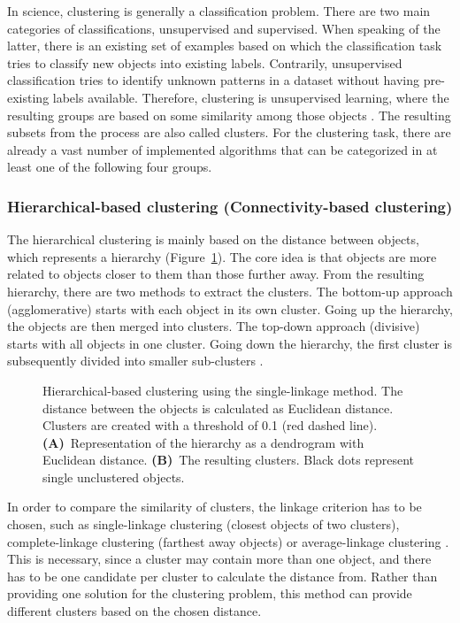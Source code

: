 \documentclass[12pt,a4paper,english]{article}
\begin{document}
	In science, clustering is generally a classification problem.
	There are two main categories of classifications, unsupervised and supervised. When speaking of the latter, there is an existing set of examples based on which the classification task tries to classify new objects into existing labels.
	Contrarily, unsupervised classification tries to identify unknown patterns in a dataset without having pre-existing labels available.
	Therefore, clustering is unsupervised learning, where the resulting groups are based on some similarity among those objects \citep{cl_technique:17}. 
	The resulting subsets from the process are also called clusters.
	For the clustering task, there are already a vast number of implemented algorithms that can be categorized in at least one of the following four groups.
	
\subsubsection*{Hierarchical-based clustering (Connectivity-based clustering)}
	The hierarchical clustering is mainly based on the distance between objects, which represents a hierarchy (Figure~\ref{img:hierarchical}). The core idea is that objects are more related to objects closer to them than those further away.
	From the resulting hierarchy, there are two methods to extract the clusters. The bottom-up approach (agglomerative) starts with each object in its own cluster. Going up the hierarchy, the objects are then merged into clusters.
	The top-down approach (divisive) starts with all objects in one cluster. Going down the hierarchy, the first cluster is subsequently divided into smaller sub-clusters \citep{hierarchical:09}.
	
	\begin{figure}[H]
		\centering
		\def\svgwidth{\textwidth}
		\vspace{-15pt}
		
		\caption[Hierarchical-based clustering using the single-linkage method.]{Hierarchical-based clustering using the single-linkage method. The distance between the objects is calculated as Euclidean distance. Clusters are created with a threshold of 0.1 (red dashed line). \textbf{(A)}~Representation of the hierarchy as a dendrogram with Euclidean distance. \textbf{(B)}~The resulting clusters. Black dots represent single unclustered objects.}
		\label{img:hierarchical}
	\end{figure}

	In order to compare the similarity of clusters, the linkage criterion has to be chosen, such as single-linkage clustering (closest objects of two clusters), complete-linkage clustering (farthest away objects) or average-linkage clustering \citep{linkage_criterion:13}. This is necessary, since a cluster may contain more than one object, and there has to be one candidate per cluster to calculate the distance from.
	Rather than providing one solution for the clustering problem, this method can provide different clusters based on the chosen distance.
	\newpage
		
\end{document}

